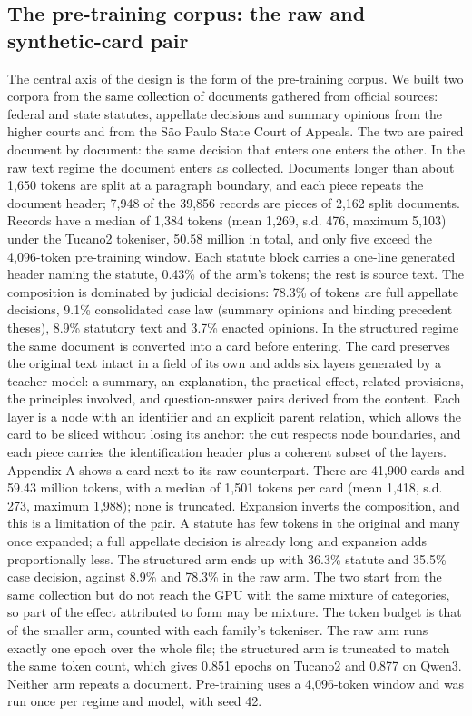 \documentclass{IOS-Book-Article}
\begin{document}
\subsection{The pre-training corpus: the raw and synthetic-card pair}
The central axis of the design is the form of the pre-training corpus. We built two corpora from the same collection of documents gathered from official sources: federal and state statutes, appellate decisions and summary opinions from the higher courts and from the São Paulo State Court of Appeals. The two are paired document by document: the same decision that enters one enters the other.
In the raw text regime the document enters as collected. Documents longer than about 1,650 tokens are split at a paragraph boundary, and each piece repeats the document header; 7,948 of the 39,856 records are pieces of 2,162 split documents. Records have a median of 1,384 tokens (mean 1,269, s.d. 476, maximum 5,103) under the Tucano2 tokeniser, 50.58 million in total, and only five exceed the 4,096-token pre-training window. Each statute block carries a one-line generated header naming the statute, 0.43\% of the arm's tokens; the rest is source text. The composition is dominated by judicial decisions: 78.3\% of tokens are full appellate decisions, 9.1\% consolidated case law (summary opinions and binding precedent theses), 8.9\% statutory text and 3.7\% enacted opinions.
In the structured regime the same document is converted into a card before entering. The card preserves the original text intact in a field of its own and adds six layers generated by a teacher model: a summary, an explanation, the practical effect, related provisions, the principles involved, and question-answer pairs derived from the content. Each layer is a node with an identifier and an explicit parent relation, which allows the card to be sliced without losing its anchor: the cut respects node boundaries, and each piece carries the identification header plus a coherent subset of the layers. Appendix A shows a card next to its raw counterpart. There are 41,900 cards and 59.43 million tokens, with a median of 1,501 tokens per card (mean 1,418, s.d. 273, maximum 1,988); none is truncated.
Expansion inverts the composition, and this is a limitation of the pair. A statute has few tokens in the original and many once expanded; a full appellate decision is already long and expansion adds proportionally less. The structured arm ends up with 36.3\% statute and 35.5\% case decision, against 8.9\% and 78.3\% in the raw arm. The two start from the same collection but do not reach the GPU with the same mixture of categories, so part of the effect attributed to form may be mixture.
The token budget is that of the smaller arm, counted with each family's tokeniser. The raw arm runs exactly one epoch over the whole file; the structured arm is truncated to match the same token count, which gives 0.851 epochs on Tucano2 and 0.877 on Qwen3. Neither arm repeats a document. Pre-training uses a 4,096-token window and was run once per regime and model, with seed 42.
\end{document}
